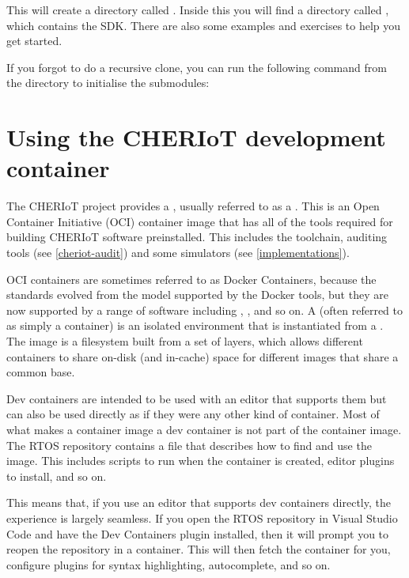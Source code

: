 This will create a directory called .
Inside this you will find a directory called , which contains the SDK.
There are also some examples and exercises to help you get started.

If you forgot to do a recursive clone, you can run the following command from the  directory to initialise the submodules:


\section[label=devcontainer]{Using the CHERIoT development container}

The CHERIoT project provides a , usually referred to as a .
This is an Open Container Initiative (OCI) container image that has all of the tools required for building CHERIoT software preinstalled.
This includes the toolchain, auditing tools (see \ref{cheriot-audit}) and some simulators (see \ref{implementations}).

OCI containers are sometimes referred to as Docker Containers, because the standards evolved from the model supported by the Docker tools, but they are now supported by a range of software including , , and so on.
A  (often referred to as simply a container) is an isolated environment that is instantiated from a .
The image is a filesystem built from a set of layers, which allows different containers to share on-disk (and in-cache) space for different images that share a common base.

Dev containers are intended to be used with an editor that supports them but can also be used directly as if they were any other kind of container.
Most of what makes a container image a dev container is not part of the container image.
The RTOS repository contains a  file that describes how to find and use the image.
This includes scripts to run when the container is created, editor plugins to install, and so on.

This means that, if you use an editor that supports dev containers directly, the experience is largely seamless.
If you open the RTOS repository in Visual Studio Code and have the Dev Containers plugin installed, then it will prompt you to reopen the repository in a container.
This will then fetch the container for you, configure plugins for syntax highlighting, autocomplete, and so on.

